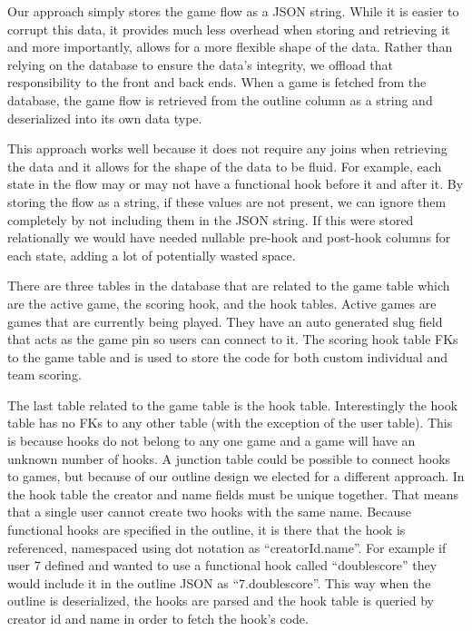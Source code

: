 \documentclass{article}
\begin{document}
		Our approach simply stores the game flow as a JSON string. While it is easier to corrupt this data, it provides much less overhead when storing and retrieving it and more importantly, allows for a more flexible shape of the data. Rather than relying on the database to ensure the data's integrity, we offload that responsibility to the front and back ends. When a game is fetched from the database, the game flow is retrieved from the outline column as a string and deserialized into its own data type.
		\smallskip
		
		This approach works well because it does not require any joins when retrieving the data and it allows for the shape of the data to be fluid. For example, each state in the flow may or may not have a functional hook before it and after it. By storing the flow as a string, if these values are not present, we can ignore them completely by not including them in the JSON string. If this were stored relationally we would have needed nullable pre-hook and post-hook columns for each state, adding a lot of potentially wasted space.
		\smallskip
		
		There are three tables in the database that are related to the game table which are the active game, the scoring hook, and the hook tables. Active games are games that are currently being played. They have an auto generated slug field that acts as the game pin so users can connect to it. The scoring hook table FKs to the game table and is used to store the code for both custom individual and team scoring.
		\smallskip
		
		The last table related to the game table is the hook table. Interestingly the hook table has no FKs to any other table (with the exception of the user table). This is because hooks do not belong to any one game and a game will have an unknown number of hooks. A junction table could be possible to connect hooks to games, but because of our outline design we elected for a different approach. In the hook table the creator and name fields must be unique together. That means that a single user cannot create two hooks with the same name. Because functional hooks are specified in the outline, it is there that the hook is referenced, namespaced using dot notation as ``creatorId.name''. For example if user 7 defined and wanted to use a functional hook called ``doublescore'' they would include it in the outline JSON as ``7.doublescore''. This way when the outline is deserialized, the hooks are parsed and the hook table is queried by creator id and name in order to fetch the hook's code.
		
\end{document}
